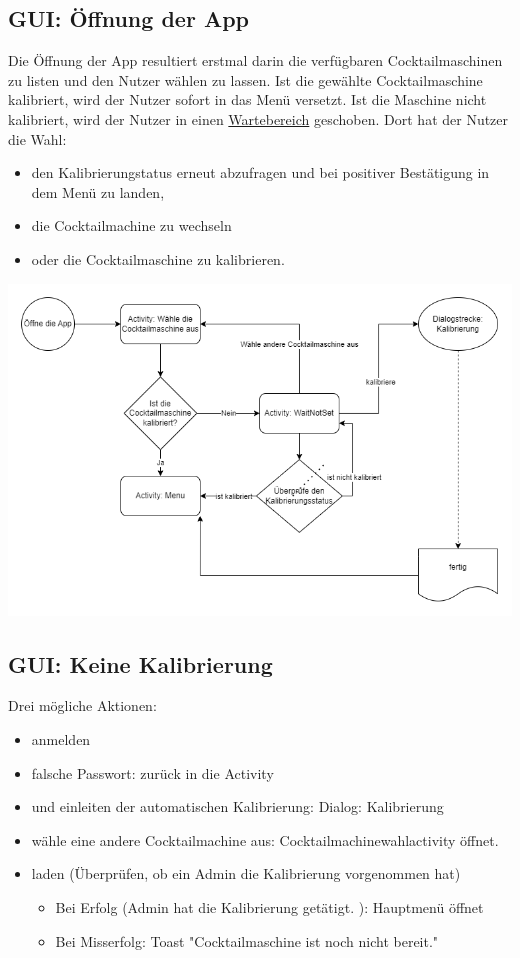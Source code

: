 \subsection{GUI: Öffnung der App}
Die Öffnung der App resultiert erstmal darin die verfügbaren Cocktailmaschinen zu listen und den Nutzer wählen zu lassen. Ist die gewählte Cocktailmaschine kalibriert, wird der Nutzer sofort in das Menü versetzt. Ist die Maschine nicht kalibriert, wird der Nutzer in einen \hyperref[subsec:nocal]{Wartebereich} geschoben. Dort hat der Nutzer die Wahl:
\begin{itemize}
	\item den Kalibrierungstatus erneut abzufragen und bei positiver Bestätigung in dem Menü zu landen, 
	\item die Cocktailmachine zu wechseln
	\item oder die Cocktailmaschine zu kalibrieren.
\end{itemize}
\includegraphics[scale=0.40]{Appstart.png}


\subsection{GUI: Keine Kalibrierung}
\label{subsec:nocal}

Drei mögliche Aktionen:

\begin{itemize}
\item anmelden
\item falsche Passwort: zurück in die Activity
\item und einleiten der automatischen Kalibrierung: Dialog: Kalibrierung
\item wähle eine andere Cocktailmachine aus: Cocktailmachinewahlactivity öffnet.
\item laden (Überprüfen, ob ein Admin die Kalibrierung vorgenommen hat)
\begin{itemize}

	\item Bei Erfolg (Admin hat die Kalibrierung getätigt. ): Hauptmenü öffnet
	
	\item Bei Misserfolg: Toast "Cocktailmaschine ist noch nicht bereit."

\end{itemize}
\end{itemize}



